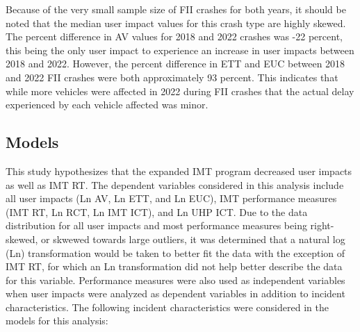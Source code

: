 \documentclass[
  letterpaper,
  authoryear]{elsarticle}
\begin{document}
Because of the very small sample size of FII crashes for both years, it
should be noted that the median user impact values for this crash type
are highly skewed. The percent difference in AV values for 2018 and 2022
crashes was -22 percent, this being the only user impact to experience
an increase in user impacts between 2018 and 2022. However, the percent
difference in ETT and EUC between 2018 and 2022 FII crashes were both
approximately 93 percent. This indicates that while more vehicles were
affected in 2022 during FII crashes that the actual delay experienced by
each vehicle affected was minor.

\begin{table}

\caption{\label{tbl-FIIUserImpacts}Median User Impacts of FII Crashes}


\end{table}%

\subsection{Models}\label{models}

This study hypothesizes that the expanded IMT program decreased user
impacts as well as IMT RT. The dependent variables considered in this
analysis include all user impacts (Ln AV, Ln ETT, and Ln EUC), IMT
performance measures (IMT RT, Ln RCT, Ln IMT ICT), and Ln UHP ICT. Due
to the data distribution for all user impacts and most performance
measures being right-skewed, or skwewed towards large outliers, it was
determined that a natural log (Ln) transformation would be taken to
better fit the data with the exception of IMT RT, for which an Ln
transformation did not help better describe the data for this variable.
Performance measures were also used as independent variables when user
impacts were analyzed as dependent variables in addition to incident
characteristics. The following incident characteristics were considered
in the models for this analysis:
\end{document}
